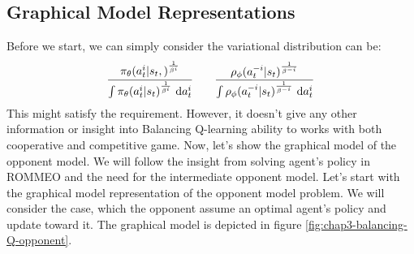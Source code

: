 \label{sec:chap3-prob-balancing-q}

\subsection{Graphical Model Representations}
Before we start, we can simply consider the variational distribution can be:
\begin{equation}
    \cfrac{\pi_\theta(a^i_t | s_t,)^{\frac{1}{\beta^i}}}{\int  \pi_\theta(a^i_t | s_t)^{\frac{1}{\beta^i}}\ \mathrm{d} a^i_t} \qquad \frac{\rho_\phi(a^{-i}_t | s_t)^{\frac{1}{\beta^{-i}}}}{\int  \rho_\phi(a^{-i}_t | s_t)^{\frac{1}{\beta^{-i}}}\ \mathrm{d} a^i_t} 
\end{equation}
This might satisfy the requirement. However, it doesn't give any other information or insight into Balancing Q-learning ability to works with both cooperative and competitive game. Now, let's show the graphical model of the opponent model. We will follow the insight from solving agent's policy in ROMMEO and the need for the intermediate opponent model. Let's start with the graphical model representation of the opponent model problem. We will consider the case, which the opponent assume an optimal agent's policy and update toward it. The graphical model is depicted in figure \ref{fig:chap3-balancing-Q-opponent}.
